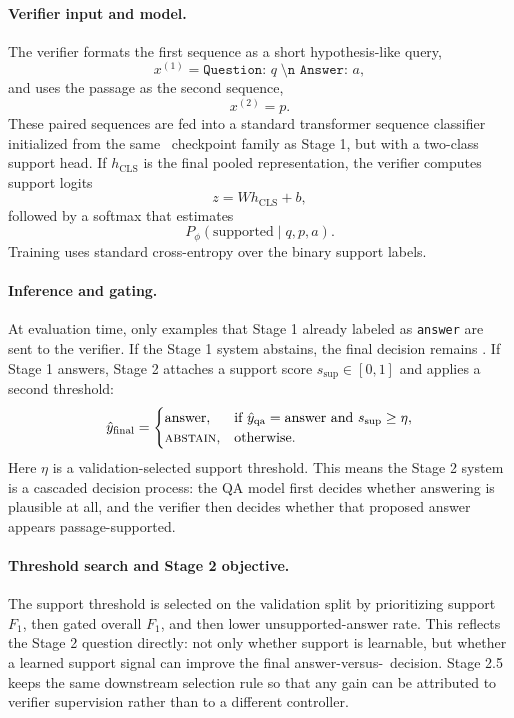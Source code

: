 \paragraph{Verifier input and model.}
The verifier formats the first sequence as a short hypothesis-like query,
\begin{equation}
  x^{(1)} = \texttt{Question: } q \; \texttt{\textbackslash n Answer: } a,
\end{equation}
and uses the passage as the second sequence,
\begin{equation}
  x^{(2)} = p.
\end{equation}
These paired sequences are fed into a standard transformer sequence classifier
initialized from the same \modelname\ checkpoint family as Stage 1, but with a
two-class support head.
If \(h_{\mathrm{CLS}}\) is the final pooled representation, the verifier
computes support logits
\begin{equation}
  z = W h_{\mathrm{CLS}} + b,
\end{equation}
followed by a softmax that estimates
\begin{equation}
  P_{\phi}(\text{supported} \mid q, p, a).
\end{equation}
Training uses standard cross-entropy over the binary support labels.

\paragraph{Inference and gating.}
At evaluation time, only examples that Stage 1 already labeled as
\texttt{answer} are sent to the verifier.
If the Stage 1 system abstains, the final decision remains \abstain.
If Stage 1 answers, Stage 2 attaches a support score
\(s_{\mathrm{sup}} \in [0, 1]\) and applies a second threshold:
\begin{equation}
  \hat{y}_{\mathrm{final}}
  =
  \begin{cases}
    \text{answer}, & \text{if } \hat{y}_{\mathrm{qa}}=\text{answer}
    \text{ and } s_{\mathrm{sup}} \ge \eta, \\
    \textsc{abstain}, & \text{otherwise.}
  \end{cases}
\end{equation}
Here \(\eta\) is a validation-selected support threshold.
This means the Stage 2 system is a cascaded decision process:
the QA model first decides whether answering is plausible at all, and the
verifier then decides whether that proposed answer appears passage-supported.

\paragraph{Threshold search and Stage 2 objective.}
The support threshold is selected on the validation split by prioritizing
support \(F_1\), then gated overall \(F_1\), and then lower unsupported-answer
rate.
This reflects the Stage 2 question directly:
not only whether support is learnable, but whether a learned support signal can
improve the final answer-versus-\abstain\ decision.
Stage 2.5 keeps the same downstream selection rule so that any gain can be
attributed to verifier supervision rather than to a different controller.

